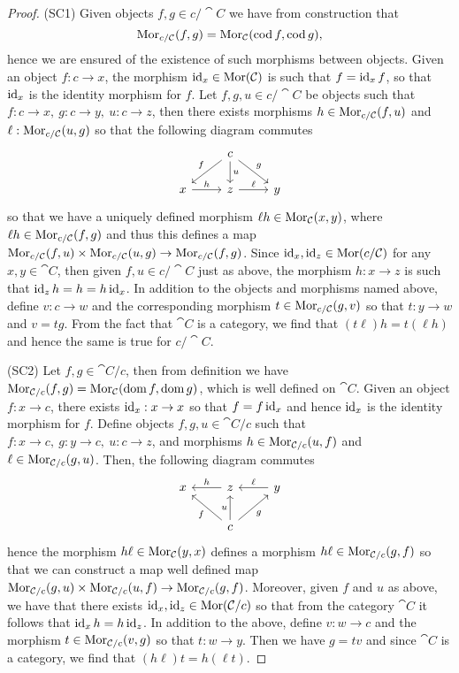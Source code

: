 \begin{proof}
(SC1) Given objects \(f, g \in c/\cat C\) we have from construction that
\[
  \operatorname{Mor}_{c/\mathcal C}(f, g) = \operatorname{Mor}_{\mathcal C}(\operatorname{cod} f, \operatorname{cod} g),
\]
hence we are
ensured of the existence of such morphisms between objects. Given an object
\(f: c \to x\), the morphism \(\operatorname{id}_x \in \operatorname{Mor}(\mathcal C)\) is such that \(f =
\operatorname{id}_x  f\), so that \(\operatorname{id}_x\) is the identity morphism for \(f\). Let
\(f, g, u \in c/\cat C\) be objects such that \(f: c \to x,\ g: c \to y,\ u: c
\to z\), then there exists morphisms \(h \in \operatorname{Mor}_{c/\mathcal C}(f, u)\) and
\(\ell: \operatorname{Mor}_{c/\mathcal C}(u, g)\) so that the following diagram commutes
\[
  \begin{tikzcd}
      &c \ar[dl, swap, "f"] \ar[d, "u"] \ar[dr, "g"] & \\
    x \ar[r, "h"]
      &z \ar[r, "\ell"]
        &y
  \end{tikzcd}
\]
so that we have a uniquely defined morphism \(\ell  h \in \operatorname{Mor}_{\mathcal
C}(x, y)\), where \(\ell  h \in \operatorname{Mor}_{c/\mathcal C}(f, g)\) and
thus this defines a map \(\operatorname{Mor}_{c/\mathcal C}(f, u) \times \operatorname{Mor}_{c/\mathcal C}(u, g)
\to \operatorname{Mor}_{c/\mathcal C}(f, g)\). Since \(\operatorname{id}_x, \operatorname{id}_z \in \operatorname{Mor}(c/\mathcal C)\) for any
\(x, y \in \cat C\), then given \(f, u \in c/\cat C\) just as above, the
morphism \(h: x \to z\) is such that \(\operatorname{id}_z  h = h = h  \operatorname{id}_x\). In
addition to the objects and morphisms named above, define \(v: c \to w\) and
the corresponding morphism \(t \in \operatorname{Mor}_{c/\mathcal C}(g, v)\) so that \(t: y \to
w\) and \(v = t  g\). From the fact that \(\cat C\) is a category, we
find that \((t  \ell)  h = t  (\ell  h)\) and hence the
same is true for \(c/\cat C\).

(SC2) Let \(f, g \in \cat C/c\), then from definition we have \(\operatorname{Mor}_{\mathcal
C/c}(f, g) = \operatorname{Mor}_{\mathcal C}(\operatorname{dom} f, \operatorname{dom} g)\), which is well defined on \(\cat
C\). Given an object \(f: x \to c\), there exists \(\operatorname{id}_x: x \to x\) so that
\(f = f  \operatorname{id}_x\) and hence \(\operatorname{id}_x\) is the identity morphism for \(f\).
Define objects \(f, g, u \in \cat C/c\) such that \(f: x \to c,\ g: y \to c,\
u: c \to z\), and morphisms \(h \in \operatorname{Mor}_{\mathcal C/c}(u, f)\) and \(\ell \in
\operatorname{Mor}_{\mathcal C/c}(g, u)\). Then, the following diagram commutes
\[
  \begin{tikzcd}
    x
      &z \ar[l, swap, "h"]
        &y \ar[l, swap, "\ell"] \\
      &c \ar[lu, "f"] \ar[u, "u"] \ar[ru, swap, "g"]
  \end{tikzcd}
\]
hence the morphism \(h  \ell \in \operatorname{Mor}_{\mathcal C}(y, x)\) defines a morphism
\(h  \ell \in \operatorname{Mor}_{\mathcal C/c}(g, f)\) so that we can construct a map well
defined map \(\operatorname{Mor}_{\mathcal C/c}(g, u) \times \operatorname{Mor}_{\mathcal C/c}(u, f) \to
\operatorname{Mor}_{\mathcal C/c}(g, f)\). Moreover, given \(f\) and \(u\) as above, we have
that there exists \(\operatorname{id}_x, \operatorname{id}_z \in \operatorname{Mor}(\mathcal C/c)\) so that from the
category \(\cat C\) it follows that \(\operatorname{id}_x  h = h  \operatorname{id}_z\). In
addition to the above, define \(v: w \to c\) and the morphism \(t \in
\operatorname{Mor}_{\mathcal C/c}(v, g)\) so that \(t: w \to y\). Then we have \(g = t  v\)
and since \(\cat C\) is a category, we find that \((h  \ell)  t = h
  (\ell  t)\).
\end{proof}

